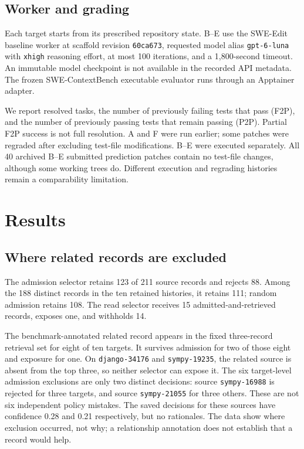 \documentclass[sigconf,anonymous]{aamas}
\begin{document}
\subsection{Worker and grading}
Each target starts from its prescribed repository state. B--E use the SWE-Edit baseline worker at scaffold revision \texttt{60ca673}, requested model alias \texttt{gpt-6-luna} with \texttt{xhigh} reasoning effort, at most 100 iterations, and a 1,800-second timeout. An immutable model checkpoint is not available in the recorded API metadata. The frozen SWE-ContextBench executable evaluator runs through an Apptainer adapter.

We report resolved tasks, the number of previously failing tests that pass (F2P), and the number of previously passing tests that remain passing (P2P). Partial F2P success is not full resolution. A and F were run earlier; some patches were regraded after excluding test-file modifications. B--E were executed separately. All 40 archived B--E submitted prediction patches contain no test-file changes, although some working trees do. Different execution and regrading histories remain a comparability limitation.

\section{Results}
\subsection{Where related records are excluded}
The admission selector retains 123 of 211 source records and rejects 88. Among the 188 distinct records in the ten retained histories, it retains 111; random admission retains 108. The read selector receives 15 admitted-and-retrieved records, exposes one, and withholds 14.

The benchmark-annotated related record appears in the fixed three-record retrieval set for eight of ten targets. It survives admission for two of those eight and exposure for one. On \texttt{django-34176} and \texttt{sympy-19235}, the related source is absent from the top three, so neither selector can expose it. The six target-level admission exclusions are only two distinct decisions: source \texttt{sympy-16988} is rejected for three targets, and source \texttt{sympy-21055} for three others. These are not six independent policy mistakes. The saved decisions for these sources have confidence 0.28 and 0.21 respectively, but no rationales. The data show where exclusion occurred, not why; a relationship annotation does not establish that a record would help.
\end{document}
